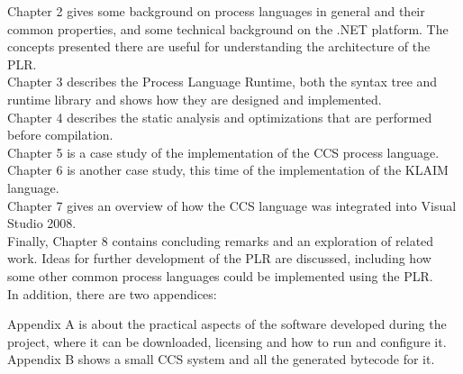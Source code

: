 	Chapter 2 gives some background on process languages in general and their 
	common properties, and some technical background on the .NET platform. The 
	concepts presented there are useful for understanding the architecture of 
	the PLR.\\
	Chapter 3 describes the Process Language Runtime, both the syntax tree and 
	runtime library and shows how they are designed and implemented. \\
	Chapter 4 describes the static analysis and optimizations that are performed
	before compilation.\\
	Chapter 5 is a case study of the implementation of the CCS process 
	language.\\
	Chapter 6 is another case study, this time of the implementation of the 
	KLAIM language.\\
	Chapter 7 gives an overview of how the CCS language was integrated into 
	Visual Studio 2008. \\
	Finally, Chapter 8 contains concluding remarks and an exploration of related 
	work. Ideas for further development of the PLR are discussed, including how 
	some other common process languages could be implemented using the PLR.\\
 
	In addition, there are two appendices:
	
	Appendix A is about the practical aspects of the software developed during 
	the project, where it can be downloaded, licensing and how to run and 
	configure it.\\
	Appendix B shows a small CCS system and all the generated bytecode for it.